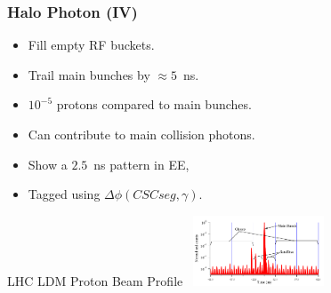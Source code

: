 \documentclass{beamer}
\begin{document}
\begin{frame}
\frametitle{Halo Photon (IV)}
 \begin{minipage}[t]{0.85\paperwidth}
    \begin{tcolorbox}[colback=UNL@Cream!5,colframe=UMN@Maroon!40,title=\textcolor{UMN@Maroon}{ \textbf{Satellite/Ghost Beam Halos}}]
      \begin{itemize}
       \item Fill empty RF buckets.
       \item Trail main bunches by $\approx 5$~ns.
       \item $10^{-5}$ protons compared to main bunches.
       \item Can contribute to main collision photons.
       \item Show a $2.5$~ns pattern in EE,
       \item Tagged using $\Delta\phi(CSC seg, \gamma)$.
      \end{itemize} 
      \end{tcolorbox}
 \end{minipage}
 \begin{minipage}[t]{0.95\paperwidth}
    \centering
    \begin{varblock}[6cm]{LHC LDM Proton Beam Profile}
    \centering
    \mbox{
     \includegraphics[height=2.1cm,width=0.8\linewidth]{THESISPLOTS/Ghost-Satellite-Bunches-LDM.png} 
     }
     \end{varblock}  
 \end{minipage}
 
\end{frame}
\end{document}
